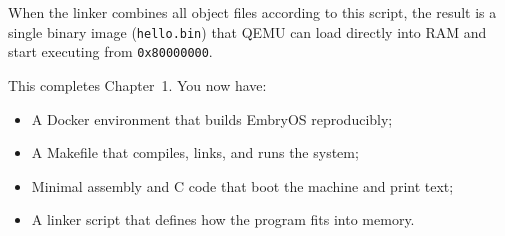 \medskip
\noindent
When the linker combines all object files according to this script, the result
is a single binary image (\texttt{hello.bin}) that QEMU can load directly into
RAM and start executing from \texttt{0x80000000}.

\bigskip
\noindent
This completes Chapter~1.  You now have:
\begin{itemize}
  \item A Docker environment that builds EmbryOS reproducibly;
  \item A Makefile that compiles, links, and runs the system;
  \item Minimal assembly and C code that boot the machine and print text;
  \item A linker script that defines how the program fits into memory.
\end{itemize}
